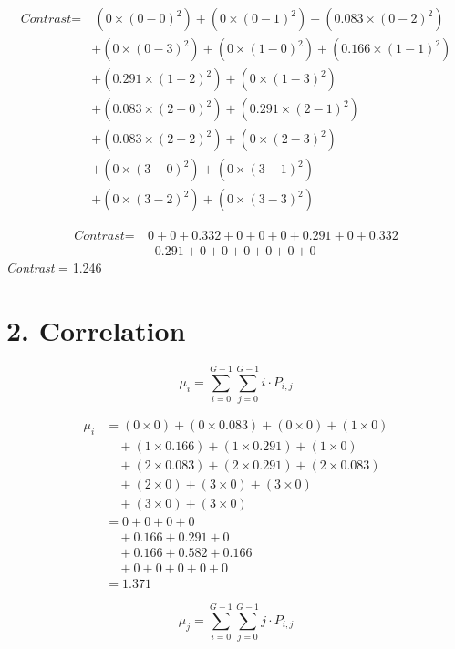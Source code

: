 \begin{center}
\begin{align*}
\textit{Contrast} = 
&\ (0 \times (0 - 0)^2) + (0 \times (0 - 1)^2) + (0.083 \times (0 - 2)^2) \\
& + (0 \times (0 - 3)^2) + (0 \times (1 - 0)^2) + (0.166 \times (1 - 1)^2) \\
& + (0.291 \times (1 - 2)^2) + (0 \times (1 - 3)^2) \\
& + (0.083 \times (2 - 0)^2) + (0.291 \times (2 - 1)^2) \\
& + (0.083 \times (2 - 2)^2) + (0 \times (2 - 3)^2) \\
& + (0 \times (3 - 0)^2) + (0 \times (3 - 1)^2) \\
& + (0 \times (3 - 2)^2) + (0 \times (3 - 3)^2)
\end{align*}

\begin{align*}
\textit{Contrast} =
&\ 0 + 0 + 0.332 + 0 + 0 + 0 + 0.291 + 0 + 0.332 \\
& + 0.291 + 0 + 0 + 0 + 0 + 0 + 0
\end{align*}
\textit{Contrast} = 1.246
\end{center}

\section*{2. Correlation}

\[
\mu_i = \sum_{i=0}^{G-1} \sum_{j=0}^{G-1} i \cdot P_{i,j}
\]

\begin{align*}
\mu_i &= (0 \times 0) + (0 \times 0.083) + (0 \times 0) + (1 \times 0) \\
&\quad + (1 \times 0.166) + (1 \times 0.291) + (1 \times 0) \\
&\quad + (2 \times 0.083) + (2 \times 0.291) + (2 \times 0.083) \\
&\quad + (2 \times 0) + (3 \times 0) + (3 \times 0) \\
&\quad + (3 \times 0) + (3 \times 0) \\
&= 0 + 0 + 0 + 0 \\
&\quad + 0.166 + 0.291 + 0 \\
&\quad + 0.166 + 0.582 + 0.166 \\
&\quad + 0 + 0 + 0 + 0 + 0 \\
&= 1.371
\end{align*}

\[
\mu_j = \sum_{i=0}^{G-1} \sum_{j=0}^{G-1} j \cdot P_{i,j}
\]

